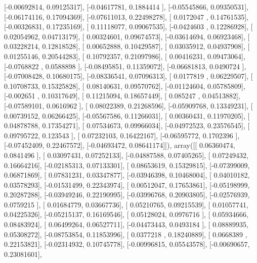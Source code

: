 \documentclass{article}
\begin{document}
       [-0.00692814,  0.09125317],
       [-0.04617781,  0.1884414 ],
       [-0.05545866,  0.09350531],
       [-0.06174116,  0.17094369],
       [-0.07611013,  0.22498278],
       [ 0.0172047 ,  0.14761535],
       [-0.00326831,  0.17235169],
       [ 0.11118077,  0.09067535],
       [-0.0424603 ,  0.12286928],
       [ 0.02054962,  0.04713179],
       [ 0.00324601,  0.09674573],
       [-0.03614694,  0.06923468],
       [ 0.03228214,  0.12818528],
       [ 0.00652888,  0.10429587],
       [ 0.03035912,  0.04937908],
       [ 0.01255146,  0.20544283],
       [ 0.10792357,  0.21097986],
       [ 0.00416231,  0.09473064],
       [-0.0768822 ,  0.0588898 ],
       [-0.08495851,  0.11359072],
       [-0.06681813,  0.0490724 ],
       [-0.07008428,  0.10680175],
       [-0.08336541,  0.07096313],
       [ 0.0177819 ,  0.06229507],
       [ 0.10708733,  0.15325828],
       [ 0.08140631,  0.09570762],
       [-0.01124604,  0.05785809],
       [-0.002651  ,  0.10317649],
       [ 0.11215094,  0.18657449],
       [ 0.085247  ,  0.04513882],
       [-0.07589101,  0.0616962 ],
       [ 0.08022389,  0.21268596],
       [-0.05909768,  0.13349231],
       [ 0.00739152,  0.06266425],
       [-0.05567586,  0.11266031],
       [ 0.00360431,  0.11970205],
       [ 0.04878788,  0.17354271],
       [ 0.07534673,  0.09966034],
       [-0.04972523,  0.23576545],
       [ 0.09795722,  0.123543  ],
       [ 0.07232103,  0.16422167],
       [-0.06595772,  0.1702396 ],
       [-0.07452409,  0.22467572],
       [-0.04693472,  0.08641174]]), array([[ 0.06360474,  0.0841496 ],
       [ 0.03097431,  0.07252133],
       [-0.04887588,  0.07405265],
       [ 0.07249432,  0.16664216],
       [-0.02185313,  0.07133301],
       [ 0.08653619,  0.15329815],
       [-0.07399009,  0.06871869],
       [ 0.07831231,  0.03347877],
       [-0.03946398,  0.10468004],
       [ 0.04010182,  0.03578293],
       [-0.01531499,  0.22343974],
       [ 0.00512047,  0.17653861],
       [-0.05198999,  0.20287288],
       [-0.03949246,  0.22190995],
       [-0.03996768,  0.20903805],
       [-0.02576939,  0.0759215 ],
       [ 0.01684779,  0.03667736],
       [ 0.05210765,  0.09215539],
       [ 0.01057741,  0.04225326],
       [-0.05215137,  0.16169546],
       [ 0.05128024,  0.0976716 ],
       [ 0.05934666,  0.08483924],
       [ 0.06499264,  0.06527711],
       [-0.04473443,  0.0493184 ],
       [ 0.08889935,  0.05308272],
       [-0.08753854,  0.11853996],
       [ 0.0377218 ,  0.18240889],
       [ 0.0668389 ,  0.22153821],
       [-0.02314932,  0.10745778],
       [-0.00996815,  0.05543578],
       [-0.00690657,  0.23081601],
\end{document}
